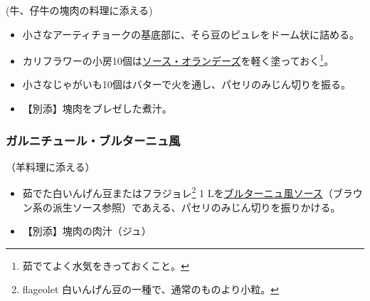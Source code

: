 \begin{recette}

(牛、仔牛の塊肉の料理に添える)

\begin{itemize}
\item
  小さなアーティチョークの基底部に、そら豆のピュレをドーム状に詰める。
\item
  カリフラワーの小房10個は\protect\hyperlink{sauce-hollandaise}{ソース・オランデーズ}を軽く塗っておく\footnote{茹でてよく水気をきっておくこと。}。
\item
  小さなじゃがいも10個はバターで火を通し、パセリのみじん切りを振る。
\item
  【別添】塊肉をブレゼした煮汁。
\end{itemize}

\atoaki{}

\hypertarget{garniture-bretonne}{%
\subsubsection{ガルニチュール・ブルターニュ風}\label{garniture-bretonne}}



（羊料理に添える）

\begin{itemize}
\item
  茹でた白いんげん豆またはフラジョレ\footnote{flageolet
    白いんげん豆の一種で、通常のものより小粒。} 1
  Lを\protect\hyperlink{sauce-bretonne}{ブルターニュ風ソース}（ブラウン系の派生ソース参照）であえる、パセリのみじん切りを振りかける。
\item
  【別添】塊肉の肉汁（ジュ）
\end{itemize}

\atoaki{}

\hypertarget{garniture-brillat-savarin}{%
}
\end{recette}
